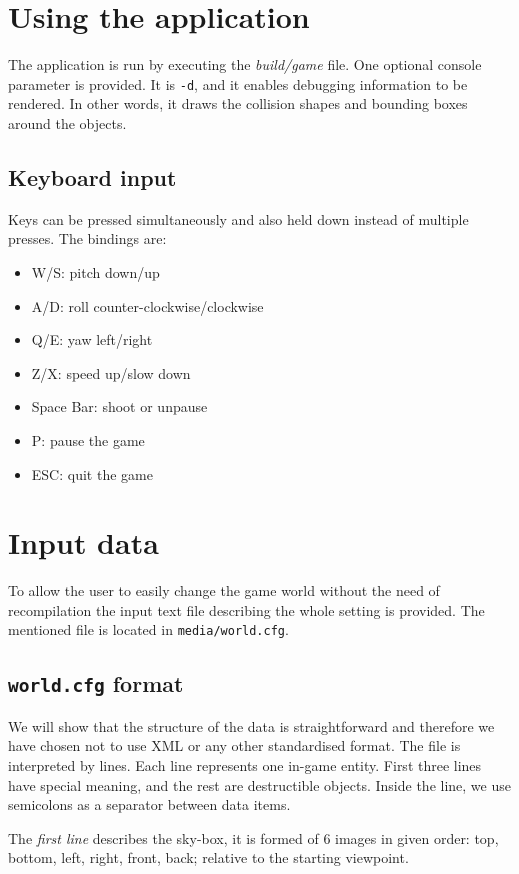 \section{Using the application}
The application is run by executing the \emph{build/game} file. One optional console parameter is provided. It is {\tt -d}, and it enables debugging information to be rendered. In other words, it draws the collision shapes and bounding boxes around the objects.
\subsection*{Keyboard input}
Keys can be pressed simultaneously and also held down instead of multiple presses. The bindings are:
\begin{itemize}
\item W/S: pitch down/up
\item A/D: roll counter-clockwise/clockwise 
\item Q/E: yaw left/right
\item Z/X: speed up/slow down
\item Space Bar: shoot or unpause
\item P: pause the game
\item ESC: quit the game
\end{itemize}


\section{Input data}
\label{sec:data}
To allow the user to easily change the game world without the need of recompilation the input text file describing the whole setting is provided. The mentioned file is located in {\tt media/world.cfg}. 

\subsection*{{\tt world.cfg} format}
We will show that the structure of the data is straightforward and therefore we have chosen not to use XML or any other standardised format. The file is interpreted by lines. Each line represents one in-game entity. First three lines have special meaning, and the rest are destructible objects. Inside the line, we use semicolons as a separator between data items.

The \emph{first line} describes the sky-box, it is formed of 6 images in given order: top, bottom, left, right, front, back; relative to the starting viewpoint. 

